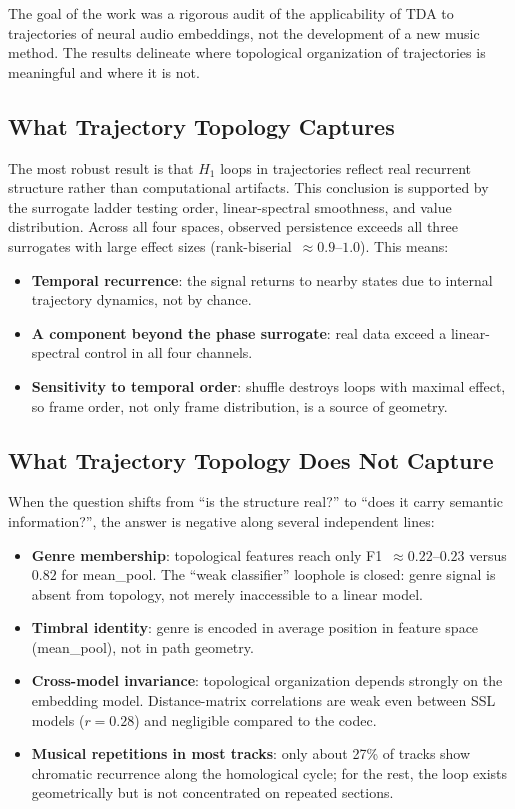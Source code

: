 The goal of the work was a rigorous audit of the applicability of TDA to trajectories of neural audio embeddings, not the development of a new music method. The results delineate where topological organization of trajectories is meaningful and where it is not.

\subsection{What Trajectory Topology Captures}

The most robust result is that $H_1$ loops in trajectories reflect real recurrent structure rather than computational artifacts. This conclusion is supported by the surrogate ladder testing order, linear-spectral smoothness, and value distribution. Across all four spaces, observed persistence exceeds all three surrogates with large effect sizes (rank-biserial~$\approx 0.9$--$1.0$). This means:
\begin{itemize}
    \item \textbf{Temporal recurrence}: the signal returns to nearby states due to internal trajectory dynamics, not by chance.
    \item \textbf{A component beyond the phase surrogate}: real data exceed a linear-spectral control in all four channels.
    \item \textbf{Sensitivity to temporal order}: shuffle destroys loops with maximal effect, so frame order, not only frame distribution, is a source of geometry.
\end{itemize}

\subsection{What Trajectory Topology Does Not Capture}

When the question shifts from ``is the structure real?'' to ``does it carry semantic information?'', the answer is negative along several independent lines:
\begin{itemize}
    \item \textbf{Genre membership}: topological features reach only F1~$\approx 0.22$--$0.23$ versus $0.82$ for mean\_pool. The ``weak classifier'' loophole is closed: genre signal is absent from topology, not merely inaccessible to a linear model.
    \item \textbf{Timbral identity}: genre is encoded in average position in feature space (mean\_pool), not in path geometry.
    \item \textbf{Cross-model invariance}: topological organization depends strongly on the embedding model. Distance-matrix correlations are weak even between SSL models ($r=0.28$) and negligible compared to the codec.
    \item \textbf{Musical repetitions in most tracks}: only about 27\% of tracks show chromatic recurrence along the homological cycle; for the rest, the loop exists geometrically but is not concentrated on repeated sections.
\end{itemize}


